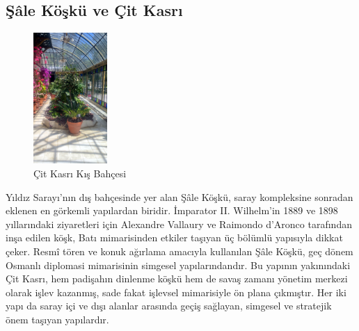 \subsection{Şâle Köşkü ve Çit Kasrı}
\begin{figure}
    \centering
    \includegraphics[width=0.25\textwidth]{assets/winter_garden.jpg}
    \caption{Çit Kasrı Kış Bahçesi}
\end{figure}
\indent\indent Yıldız Sarayı’nın dış bahçesinde yer alan Şâle Köşkü, saray kompleksine sonradan eklenen en görkemli yapılardan biridir. İmparator II. Wilhelm’in 1889 ve 1898 yıllarındaki ziyaretleri için Alexandre Vallaury ve Raimondo d’Aronco tarafından inşa edilen köşk, Batı mimarisinden etkiler taşıyan üç bölümlü yapısıyla dikkat çeker. Resmî tören ve konuk ağırlama amacıyla kullanılan Şâle Köşkü, geç dönem Osmanlı diplomasi mimarisinin simgesel yapılarındandır.\cite{dia_7}\newline
\indent Bu yapının yakınındaki Çit Kasrı, hem padişahın dinlenme köşkü hem de savaş zamanı yönetim merkezi olarak işlev kazanmış, sade fakat işlevsel mimarisiyle ön plana çıkmıştır. Her iki yapı da saray içi ve dışı alanlar arasında geçiş sağlayan, simgesel ve stratejik önem taşıyan yapılardır.\cite{dia_7}